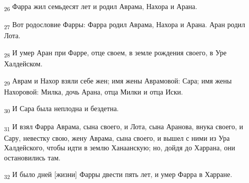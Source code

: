 \begin{tcolorbox}
\textsubscript{26} Фарра жил семьдесят лет и родил Аврама, Нахора и Арана.
\end{tcolorbox}
\begin{tcolorbox}
\textsubscript{27} Вот родословие Фарры: Фарра родил Аврама, Нахора и Арана. Аран родил Лота.
\end{tcolorbox}
\begin{tcolorbox}
\textsubscript{28} И умер Аран при Фарре, отце своем, в земле рождения своего, в Уре Халдейском.
\end{tcolorbox}
\begin{tcolorbox}
\textsubscript{29} Аврам и Нахор взяли себе жен; имя жены Аврамовой: Сара; имя жены Нахоровой: Милка, дочь Арана, отца Милки и отца Иски.
\end{tcolorbox}
\begin{tcolorbox}
\textsubscript{30} И Сара была неплодна и бездетна.
\end{tcolorbox}
\begin{tcolorbox}
\textsubscript{31} И взял Фарра Аврама, сына своего, и Лота, сына Аранова, внука своего, и Сару, невестку свою, жену Аврама, сына своего, и вышел с ними из Ура Халдейского, чтобы идти в землю Ханаанскую; но, дойдя до Харрана, они остановились там.
\end{tcolorbox}
\begin{tcolorbox}
\textsubscript{32} И было дней [жизни] Фарры двести пять лет, и умер Фарра в Харране.
\end{tcolorbox}
